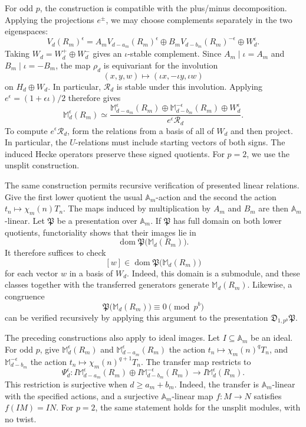 \documentclass[11pt]{article}
\theoremstyle{plain}
\theoremstyle{definition}
\theoremstyle{remark}
\numberwithin{equation}{section}
\begin{document}
For odd \(p\), the construction is compatible with the plus/minus decomposition. Applying the projections \(e^\pm\), we may choose complements separately in the two eigenspaces: \[ V_d(R_m)^\epsilon = A_mV_{d-a_m}(R_m)^\epsilon \oplus B_mV_{d-b_m}(R_m)^{-\epsilon} \oplus W_d^\epsilon. \] Taking \(W_d=W_d^+\oplus W_d^-\) gives an \(\iota\)-stable complement. Since \(A_m\mid\iota=A_m\) and \(B_m\mid\iota=-B_m\), the map \(\rho_d\) is equivariant for the involution \[ (x,y,w)\longmapsto(\iota x,-\iota y,\iota w) \] on \(H_d\oplus W_d\). In particular, \(\mathcal R_d\) is stable under this involution. Applying \(e^\epsilon=(1+\epsilon\iota)/2\) therefore gives \[ \mathbb M_d^\epsilon(R_m) \simeq \frac{ \mathbb M_{d-a_m}^\epsilon(R_m) \oplus \mathbb M_{d-b_m}^{-\epsilon}(R_m) \oplus W_d^\epsilon }{ e^\epsilon\mathcal R_d }. \] To compute \(e^\epsilon\mathcal R_d\), form the relations from a basis of all of \(W_d\) and then project. In particular, the \(U\)-relations must include starting vectors of both signs. The induced Hecke operators preserve these signed quotients. For \(p=2\), we use the unsplit construction. 

The same construction permits recursive verification of presented linear relations. Give the first lower quotient the usual \(\mathbb A_m\)-action and the second the action \(t_n\mapsto\chi_m(n)T_n\). The maps induced by multiplication by \(A_m\) and \(B_m\) are then \(\mathbb A_m\)-linear.  Let \(\mathfrak P\) be a presentation over \(\mathbb A_m\). If \(\mathfrak P\) has full domain on both lower quotients, functoriality shows that their images lie in \[ \operatorname{dom} \mathfrak P\bigl(\mathbb M_d(R_m)\bigr). \] It therefore suffices to check \[ [w]\in\operatorname{dom} \mathfrak P\bigl(\mathbb M_d(R_m)\bigr) \] for each vector \(w\) in a basis of \(W_d\). Indeed, this domain is a submodule, and these classes together with the transferred generators generate \(\mathbb M_d(R_m)\). Likewise, a congruence \[ \mathfrak P\bigl(\mathbb M_d(R_m)\bigr) \equiv0\pmod{p^b} \] can be verified recursively by applying this argument to the presentation \(\mathfrak D_{1,p^b}\mathfrak P\).

The preceding constructions also apply to ideal images. Let \(I\subseteq\mathbb A_m\) be an ideal. For odd \(p\), give \(\mathbb M_d^\epsilon(R_m)\) and \(\mathbb M_{d-a_m}^\epsilon (R_m)\) the action \(t_n\mapsto\chi_m(n)^qT_n\), and \(\mathbb M_{d-b_m}^{-\epsilon}\) the action \(t_n\mapsto\chi_m(n)^{q+1}T_n\). The transfer map restricts to \[ \Psi_d^\epsilon: I\mathbb M_{d-a_m}^\epsilon(R_m) \oplus I\mathbb M_{d-b_m}^{-\epsilon}(R_m) \longrightarrow I\mathbb M_d^\epsilon(R_m). \] This restriction is surjective when \(d\geq a_m+b_m\). Indeed, the transfer is \(\mathbb A_m\)-linear with the specified actions, and a surjective \(\mathbb A_m\)-linear map \(f:M\to N\) satisfies \(f(IM)=IN\). For \(p=2\), the same statement holds for the unsplit modules, with no twist.
\end{document}
